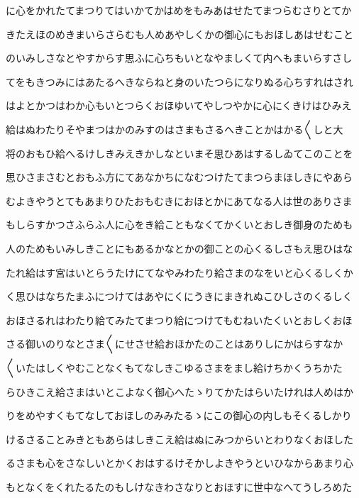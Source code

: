 \documentclass[a4paper,11pt,landscape]{ltjtarticle}
\begin{document}
\par\medskip
に心をかれたてまつりてはいかてかはめをもみあはせたてまつらむさりとてか
\par\medskip
きたえほのめきまいらさらむも人めあやしくかの御心にもおほしあはせむこと
\par\medskip
のいみしさなとやすからす思ふに心ちもいとなやましくて内へもまいらすさし
\par\medskip
てをもきつみにはあたるへきならねと身のいたつらになりぬる心ちすれはされ
\par\medskip
はよとかつはわか心もいとつらくおほゆいてやしつやかに心にくきけはひみえ
\par\medskip
給はぬわたりそやまつはかのみすのはさまもさるへきことかはかる〱しと大
\par\medskip
将のおもひ給へるけしきみえきかしなといまそ思ひあはするしゐてこのことを
\par\medskip
思ひさまさむとおもふ方にてあなかちになむつけたてまつらまほしきにやあら
\par\medskip
むよきやうとてもあまりひたおもむきにおほとかにあてなる人は世のありさま
\par\medskip
もしらすかつさふらふ人に心をき給こともなくてかくいとおしき御身のためも
\par\medskip
人のためもいみしきことにもあるかなとかの御ことの心くるしさもえ思ひはな
\par\medskip
たれ給はす宮はいとらうたけにてなやみわたり給さまのなをいと心くるしくか
\par\medskip
く思ひはなちたまふにつけてはあやにくにうきにまきれぬこひしさのくるしく
\par\medskip
おほさるれはわたり給てみたてまつり給につけてもむねいたくいとおしくおほ
\par\medskip
さる御いのりなとさま〱にせさせ給おほかたのことはありしにかはらすなか
\par\medskip
〱いたはしくやむことなくもてなしきこゆるさまをまし給けちかくうちかた
\par\medskip
らひきこえ給さまはいとこよなく御心へたゝりてかたはらいたけれは人めはか
\par\medskip
りをめやすくもてなしておほしのみみたるゝにこの御心の内しもそくるしかり
\par\medskip
けるさることみきともあらはしきこえ給はぬにみつからいとわりなくおほした
\par\medskip
るさまも心をさなしいとかくおはするけそかしよきやうといひなからあまり心
\par\medskip
もとなくをくれたるたのもしけなきわさなりとおほすに世中なへてうしろめた
\par\medskip
\end{document}

